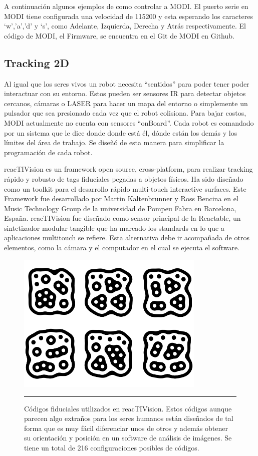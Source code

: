 A continuación algunos ejemplos de como controlar a MODI. El puerto serie en MODI tiene configurada una velocidad de 115200 y esta esperando los caracteres ‘w’,’a’,’d’ y ‘s’, como Adelante, Izquierda, Derecha y Atrás respectivamente. El código de MODI, el Firmware, se encuentra en el Git de MODI en Github.


\subsection{Tracking 2D}
Al igual que los seres vivos un robot necesita “sentidos” para poder tener poder interactuar con su entorno. Estos pueden ser sensores IR para detectar objetos cercanos, cámaras o LASER para hacer un mapa del entorno o simplemente un pulsador que sea presionado cada vez que el robot colisiona. Para bajar costos, MODI actualmente no cuenta con sensores “onBoard”. Cada robot es comandado por un sistema que le dice donde donde está él, dónde están los demás y los límites del área de trabajo. Se diseñó de esta manera para simplificar la programación de cada robot.

reacTIVision es un framework open source, cross-platform, para realizar tracking rápido y robusto de tags fiduciales pegadas a objetos físicos. Ha sido diseñado como un toolkit para el desarrollo rápido multi-touch interactive surfaces. Este Framework fue desarrollado por Martin Kaltenbrunner y Ross Bencina en el Music Technology Group de la universidad de Pompeu Fabra en Barcelona, España. reacTIVision fue diseñado como sensor principal de la Reactable, un sintetizador modular tangible que ha marcado los standards en lo que a aplicaciones multitouch se refiere. Esta alternativa debe ir acompañada de otros elementos, como la cámara y el computador en el cual se ejecuta el software. 


\begin{figure}[htbp]
	\centering
		\includegraphics[width=0.8\textwidth]{./Figures/MODI/fiducial.png}
		\rule{35em}{0.5pt}
	\caption[Fiduciales usados como tag en reacTIVision]{Códigos fiduciales utilizados en reacTIVision. Estos códigos aunque parecen algo extraños para los seres humanos están diseñados de tal forma que es muy fácil diferenciar unos de otros y además obtener su orientación y posición en un software de análisis de imágenes. Se tiene un total de 216 configuraciones posibles de códigos.}
	\label{fig:Fiducial}
\end{figure}




